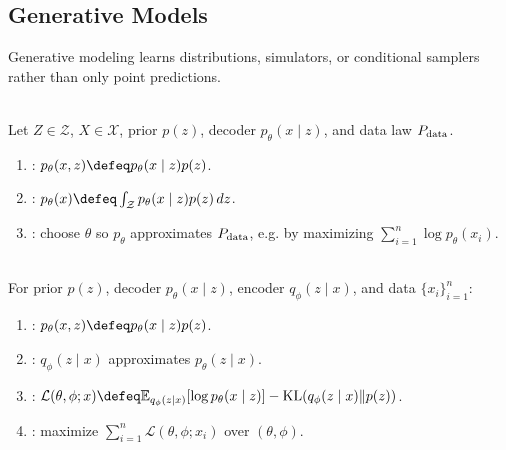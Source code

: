 \subsection{Generative Models}

Generative modeling learns distributions, simulators, or conditional samplers rather than only point predictions.

\begin{definition} \label{def:sl-latent-variable-generative-model} \\
Let $Z\in\mathcal Z$, $X\in\mathcal X$, prior $p(z)$, decoder $p_\theta(x\mid z)$, and data law $P_{\rm data}$.
\begin{enumerate}[label=(\roman*)]
\setlength{\itemsep}{0pt}
\item {}: $p_\theta(x,z)\defeq p_\theta(x\mid z)p(z)$.
\item {}: $p_\theta(x)\defeq\int_{\mathcal Z}p_\theta(x\mid z)p(z)\,dz$.
\item {}: choose $\theta$ so $p_\theta$ approximates $P_{\rm data}$, e.g. by maximizing $\sum_{i=1}^n\log p_\theta(x_i)$.
\end{enumerate}
\end{definition}

\begin{definition} \label{def:sl-variational-autoencoder} \\
For prior $p(z)$, decoder $p_\theta(x\mid z)$, encoder $q_\phi(z\mid x)$, and data $\{x_i\}_{i=1}^n$:
\begin{enumerate}[label=(\roman*)]
\setlength{\itemsep}{0pt}
\item {}: $p_\theta(x,z)\defeq p_\theta(x\mid z)p(z)$.
\item {}: $q_\phi(z\mid x)$ approximates $p_\theta(z\mid x)$.
\item {}: $\mathcal L(\theta,\phi;x)\defeq\mathbb{E}_{q_\phi(z\mid x)}[\log p_\theta(x\mid z)]-\operatorname{KL}(q_\phi(z\mid x)\|p(z))$.
\item {}: maximize $\sum_{i=1}^n\mathcal L(\theta,\phi;x_i)$ over $(\theta,\phi)$.
\end{enumerate}
\end{definition}

